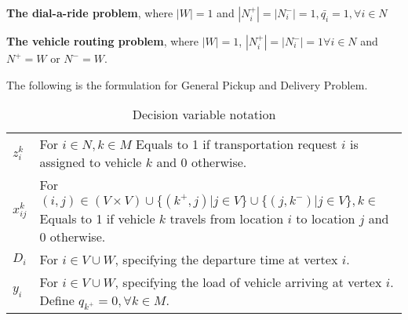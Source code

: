 				\begin{example}
					\textbf{The dial-a-ride problem}, where $|W| = 1$ and $|N_i^+| = |N_i^-| = 1, \bar{q_i} = 1, \forall i \in N$
				\end{example}

				\begin{example}
					\textbf{The vehicle routing problem}, where $|W| = 1$, $|N_i^+| = |N_i^-| = 1 \forall i \in N$ and $N^+ = W$ or $N^- = W$.
				\end{example}



				The following is the formulation for General Pickup and Delivery Problem.

				\begin{table}[!htp]
					\centering
					\caption{Decision variable notation}
					\begin{tabular}{l p{5in}}
						\hline
						$z_i^k$ & For $i \in N, k \in M$ Equals to 1 if transportation request $i$ is assigned to vehicle $k$ and 0 otherwise. \\
						$x_{ij}^k$ & For $(i, j) \in (V \times V) \cup \{(k^+, j)| j \in V\} \cup \{(j, k^-)|j \in V\}, k \in $ Equals to 1 if vehicle $k$ travels from location $i$ to location $j$ and 0 otherwise.\\
						$D_i$ & For $i \in V\cup W$, specifying the departure time at vertex $i$.\\
						$y_i$ & For $i \in V\cup W$, specifying the load of vehicle arriving at vertex $i$. Define $q_{k^+} = 0, \forall k \in M$.\\
						\hline	
					\end{tabular}
				\end{table}

